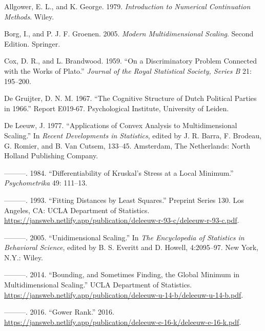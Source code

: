 \documentclass[
  12pt,
]{article}
\newlength{\cslhangindent}
\newenvironment{CSLReferences}[2] %
 {\begin{list}{}{%
  \setlength{\itemindent}{0pt}
  \setlength{\leftmargin}{0pt}
  \setlength{\parsep}{0pt}
  \ifodd #1
   \setlength{\leftmargin}{\cslhangindent}
   \setlength{\itemindent}{-1\cslhangindent}
  \fi
  \setlength{\itemsep}{#2\baselineskip}}}
 {\end{list}}
\begin{document}
\label{refs}
\begin{CSLReferences}{1}{0}
Allgower, E. L., and K. George. 1979. \emph{Introduction to Numerical
Continuation Methods}. Wiley.

Borg, I., and P. J. F. Groenen. 2005. \emph{Modern Multidimensional
Scaling}. Second Edition. Springer.

Cox, D. R., and L. Brandwood. 1959. {``{On a Discriminatory Problem
Connected with the Works of Plato}.''} \emph{Journal of the Royal
Statistical Society, Series B} 21: 195--200.

De Gruijter, D. N. M. 1967. {``{The Cognitive Structure of Dutch
Political Parties in 1966}.''} Report E019-67. Psychological Institute,
University of Leiden.

De Leeuw, J. 1977. {``Applications of Convex Analysis to
Multidimensional Scaling.''} In \emph{Recent Developments in
Statistics}, edited by J. R. Barra, F. Brodeau, G. Romier, and B. Van
Cutsem, 133--45. Amsterdam, The Netherlands: North Holland Publishing
Company.

---------. 1984. {``{Differentiability of Kruskal's Stress at a Local
Minimum}.''} \emph{Psychometrika} 49: 111--13.

---------. 1993. {``Fitting Distances by Least Squares.''} Preprint
Series 130. Los Angeles, CA: UCLA Department of Statistics.
\url{https://jansweb.netlify.app/publication/deleeuw-r-93-c/deleeuw-r-93-c.pdf}.

---------. 2005. {``{Unidimensional Scaling}.''} In \emph{The
Encyclopedia of Statistics in Behavioral Science}, edited by B. S.
Everitt and D. Howell, 4:2095--97. New York, N.Y.: Wiley.

---------. 2014. {``{Bounding, and Sometimes Finding, the Global Minimum
in Multidimensional Scaling}.''} UCLA Department of Statistics.
\url{https://jansweb.netlify.app/publication/deleeuw-u-14-b/deleeuw-u-14-b.pdf}.

---------. 2016. {``Gower Rank.''} 2016.
\url{https://jansweb.netlify.app/publication/deleeuw-e-16-k/deleeuw-e-16-k.pdf}.


\end{CSLReferences}
\end{document}
